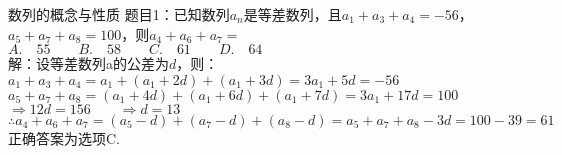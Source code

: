 \documentclass[aspectratio=169]{ctexbeamer} %
\date{\today}
\begin{document}
\begin{frame}[t]{数列的概念与性质}
题目1：已知数列${a_n}$是等差数列，且$a_1 + a_3 + a_4 = -56$，$a_5 + a_7 + a_8 = 100$，则$a_4 + a_6 + a_7 = $ \\
$A. \quad 55 \qquad B. \quad 58 \qquad C. \quad 61 \qquad D. \quad 64$ \\

\vspace{0.5cm}
\pause
解：设等差数列{a}的公差为$d$，则：\\
\pause
$a_1 + a_3 + a_4 = a_1 + (a_1 + 2d) + (a_1 + 3d) = 3a_1 + 5d = -56$ \\
$a_5 + a_7 + a_8 = (a_1 + 4d) + (a_1 + 6d) + (a_1 + 7d) = 3a_1 + 17d = 100$ \\
$\Rightarrow 12d = 156 \qquad \Rightarrow d = 13$ \\
$\therefore a_4 + a_6 + a_7 = (a_5 - d) + (a_7 - d) + (a_8 - d) = a_5 + a_7 + a_8 - 3d = 100 - 39 = 61$ \\
\pause
正确答案为选项C.
\end{frame}
\end{document}

